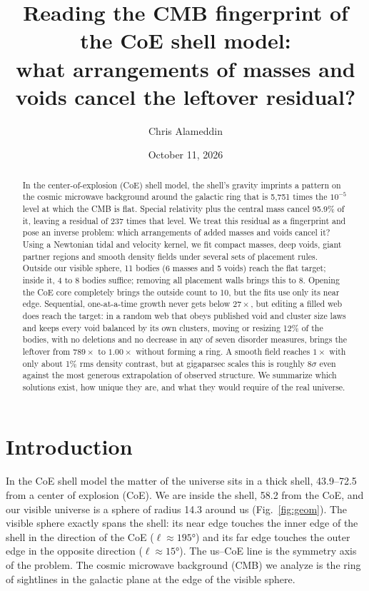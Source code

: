 \documentclass[aps,prd,twocolumn,nofootinbib,superscriptaddress,floatfix]{revtex4-2}
\begin{document}
\title{Reading the CMB fingerprint of the CoE shell model:\\ what arrangements of masses and voids cancel the leftover residual?}
\author{Chris Alameddin}
\date{October 11, 2026}
\begin{abstract}
In the center-of-explosion (CoE) shell model, the shell's gravity imprints a pattern on the cosmic microwave background around the galactic ring that is 5,751 times the $10^{-5}$ level at which the CMB is flat. Special relativity plus the central mass cancel 95.9\% of it, leaving a residual of 237 times that level. We treat this residual as a fingerprint and pose an inverse problem: which arrangements of added masses and voids cancel it? Using a Newtonian tidal and velocity kernel, we fit compact masses, deep voids, giant partner regions and smooth density fields under several sets of placement rules. Outside our visible sphere, 11 bodies (6 masses and 5 voids) reach the flat target; inside it, 4 to 8 bodies suffice; removing all placement walls brings this to 8. Opening the CoE core completely brings the outside count to 10, but the fits use only its near edge. Sequential, one-at-a-time growth never gets below $27\times$, but editing a filled web does reach the target: in a random web that obeys published void and cluster size laws and keeps every void balanced by its own clusters, moving or resizing 12\% of the bodies, with no deletions and no decrease in any of seven disorder measures, brings the leftover from $789\times$ to $1.00\times$ without forming a ring. A smooth field reaches $1\times$ with only about 1\% rms density contrast, but at gigaparsec scales this is roughly $8\sigma$ even against the most generous extrapolation of observed structure. We summarize which solutions exist, how unique they are, and what they would require of the real universe.
\end{abstract}
\maketitle

\section{Introduction}
In the CoE shell model the matter of the universe sits in a thick shell, \SIrange{43.9}{72.5}{\Gpc} from a center of explosion (CoE). We are inside the shell, \SI{58.2}{\Gpc} from the CoE, and our visible universe is a sphere of radius \SI{14.3}{\Gpc} around us (Fig.~\ref{fig:geom}). The visible sphere exactly spans the shell: its near edge touches the inner edge of the shell in the direction of the CoE ($\ell\approx\ang{195}$) and its far edge touches the outer edge in the opposite direction ($\ell\approx\ang{15}$). The us--CoE line is the symmetry axis of the problem. The cosmic microwave background (CMB) we analyze is the ring of sightlines in the galactic plane at the edge of the visible sphere.
\end{document}

